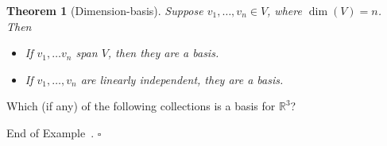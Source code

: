 \documentclass[10pt]{article}
\newtheorem{theorem}{Theorem}
\theoremstyle{definition}
\newtheorem{example}[theorem]{Example}
\renewenvironment{example}
{\begin{oldexample}}
  {\par\smallskip\hfill   End of Example~\theexample. $\square$    \par\end{oldexample}}
\newcommand{\R}{\mathbb{R}}           %
\begin{document}
\begin{theorem}[Dimension-basis]
  \label{thm:dimension-basis-lemma}
  Suppose $v_{1},\ldots,v_{n}\in V$, where $\dim(V)=n$. Then
  \begin{itemize}
    \item If $v_{1},\ldots v_{n}$ span $V$, then they are a basis.
    \item If $v_{1},\ldots,v_{n}$ are linearly independent, they are a basis.
  \end{itemize}
\end{theorem}
\begin{example}
  Which (if any) of the following collections is a basis for $\R^{3}$?
\end{example}
\end{document}
